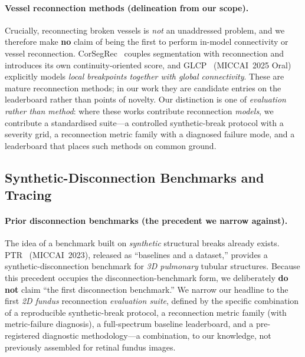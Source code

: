 \paragraph{Vessel reconnection methods (delineation from our scope).}
Crucially, reconnecting broken vessels is \emph{not} an unaddressed problem, and
we therefore make \textbf{no} claim of being the first to perform in-model
connectivity or vessel reconnection. CorSegRec~\cite{key:corsegrec} couples
segmentation with reconnection and introduces its own continuity-oriented score,
and GLCP~\cite{key:glcp} (MICCAI~2025 Oral) explicitly models \emph{local
breakpoints together with global connectivity}. These are mature reconnection
methods; in our work they are candidate entries on the leaderboard rather than
points of novelty. Our distinction is one of \emph{evaluation rather than
method}: where these works contribute reconnection \emph{models}, we contribute a
standardised suite---a controlled synthetic-break protocol with a severity grid,
a reconnection metric family with a diagnosed failure mode, and a leaderboard
that places such methods on common ground.

\subsection{Synthetic-Disconnection Benchmarks and Tracing}
\label{sec:related:bench}

\paragraph{Prior disconnection benchmarks (the precedent we narrow against).}
The idea of a benchmark built on \emph{synthetic} structural breaks already
exists. PTR~\cite{key:ptr} (MICCAI~2023), released as ``baselines and a
dataset,'' provides a synthetic-disconnection benchmark for \emph{3D pulmonary}
tubular structures. Because this precedent occupies the disconnection-benchmark
form, we deliberately \textbf{do not} claim ``the first disconnection
benchmark.'' We narrow our headline to the first \emph{2D fundus} reconnection
\emph{evaluation suite}, defined by the specific combination of a reproducible
synthetic-break protocol, a reconnection metric family (with metric-failure
diagnosis), a full-spectrum baseline leaderboard, and a pre-registered
diagnostic methodology---a combination, to our knowledge, not previously
assembled for retinal fundus images.

